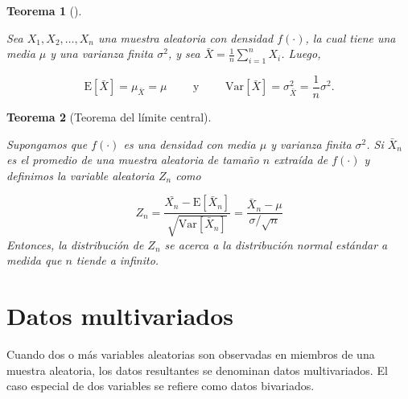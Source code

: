 \documentclass[
  letterpaper,
  DIV=11,
  numbers=noendperiod]{scrreport}
\theoremstyle{plain}
\newtheorem{theorem}{Teorema}[chapter]
\theoremstyle{definition}
\theoremstyle{definition}
\theoremstyle{plain}
\theoremstyle{remark}
\begin{document}
\begin{theorem}[]\protect\hypertarget{thm-meanvar}{}\label{thm-meanvar}

Sea \(X_1, X_2, \ldots, X_n\) una muestra aleatoria con densidad
\(f(\cdot)\), la cual tiene una media \(\mu\) y una varianza finita
\(\sigma^2\), y sea \(\bar{X} = \frac{1}{n}\sum\limits_{i=1}^n X_i\).
Luego,

\[ \mathrm{E}[\bar X]=\mu_{\bar X}=\mu\qquad \text{ y }\qquad \mathrm{Var}[\bar X]=\sigma_{\bar X}^2 =\frac{1}{n}\sigma^2.\]

\end{theorem}

\begin{theorem}[Teorema del límite
central]\protect\hypertarget{thm-TCL}{}\label{thm-TCL}

Supongamos que \(f(\cdot)\) es una densidad con media \(\mu\) y varianza
finita \(\sigma^2\). Si \(\bar{X}_n\) es el promedio de una muestra
aleatoria de tamaño \(n\) extraída de \(f(\cdot)\) y definimos la
variable aleatoria \(Z_n\) como

\[ Z_n = \frac{\bar{X_n}-\mathrm E[\bar X_n]}{\sqrt{\mathrm{Var}[\bar X_n]}}=\frac{\bar X_n-\mu}{\sigma/\sqrt n} \]
Entonces, la distribución de \(Z_n\) se acerca a la distribución normal
estándar a medida que \(n\) tiende a infinito.

\end{theorem}

\section{Datos multivariados}\label{datos-multivariados}

Cuando dos o más variables aleatorias son observadas en miembros de una
muestra aleatoria, los datos resultantes se denominan datos
multivariados. El caso especial de dos variables se refiere como datos
bivariados.
\end{document}
